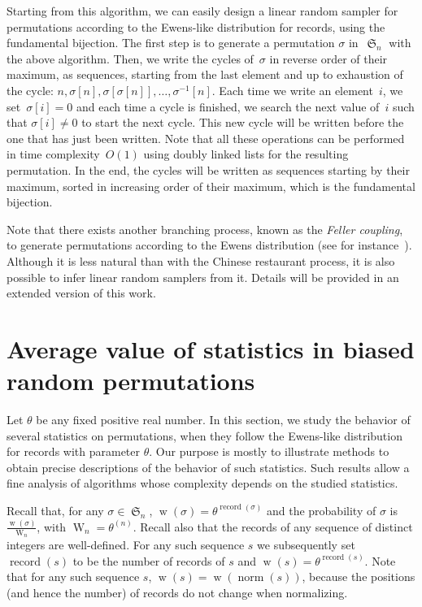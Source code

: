 \documentclass[proceedings]{aofa}
\DeclareMathOperator{\sym}{\mathfrak{S}}
\DeclareMathOperator{\weight}{w}
\DeclareMathOperator{\Weight}{W}
\DeclareMathOperator{\rec}{record}
\DeclareMathOperator{\norm}{norm}
\newcommand{\rfact}[2]{#1^{(#2)}}
\begin{document}
Starting from this algorithm, we can easily design a linear random sampler for permutations according to the Ewens-like distribution for records, using the fundamental bijection. The first step is to generate a permutation $\sigma$ in~$\sym_n$ with the above algorithm. Then, we write the cycles of~$\sigma$ in reverse order of their maximum, as sequences, starting from the last element and up to exhaustion of the cycle: $n, \sigma[n], \sigma[\sigma[n]], \dots, \sigma^{-1}[n]$. Each time we write an element~$i$, we set~$\sigma[i]=0$ and each time a cycle is finished, we search the next value of~$i$ such that $\sigma[i]\neq 0$ to start the next cycle. This new cycle will be written before the one that has just been written. Note that all these operations can be performed in time complexity~$O(1)$ using doubly linked lists for the resulting permutation. In the end, the cycles will be written as sequences starting by their maximum, sorted in increasing order of their maximum, which is the fundamental bijection.

Note that there exists another branching process, known as the {\em Feller coupling}, to generate permutations according to the Ewens distribution (see for instance~\cite[p.16]{Arratia}). 
Although it is less natural than with the Chinese restaurant process, it is also possible to infer linear random samplers from it. 
Details will be provided in an extended version of this work. 

\section{Average value of statistics in biased random permutations}\label{sec:stats}

Let $\theta$ be any fixed positive real number. 
In this section, we study the behavior of several statistics on permutations, 
when they follow the Ewens-like distribution for records with parameter $\theta$. 
Our purpose is mostly to illustrate methods to obtain precise descriptions of the behavior of such statistics. 
Such results allow a fine analysis of algorithms whose complexity depends on the studied statistics.

Recall that, for any $\sigma\in\sym_{n}$, $\weight(\sigma)=\theta^{\rec(\sigma)}$ 
and the probability of $\sigma$ is $\frac{\weight(\sigma)}{\Weight_n}$, with $\Weight_n =\rfact{\theta}{n}$. 
Recall also that the records of any sequence of distinct integers are well-defined.  
For any such sequence $s$ we subsequently set 
$\rec(s)$ to be the number of records of $s$ and $\weight(s) = \theta^{\rec(s)}$. 
Note that for any such sequence $s$, $\weight(s) = \weight(\norm(s))$, 
because the positions (and hence the number) of records do not change when normalizing. 
\end{document}
